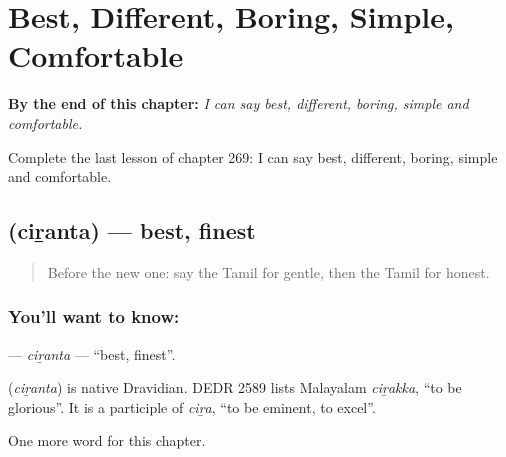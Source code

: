 
\chapter{Best, Different, Boring, Simple, Comfortable}
\label{ch:ta-best-different-boring-simple-comfortable}

\begin{chapteropening}
\textbf{By the end of this chapter:} \emph{I can say best, different, boring, simple and comfortable.}

Complete the last lesson of chapter 269: I can say best, different, boring, simple and comfortable.
\end{chapteropening}

\section[\texorpdfstring{\ta{சிறந்த} (ciṟanta)}{சிறந்த (ciṟanta)}]{ (ciṟanta) — best, finest}

\label{lesson:TA-C269-ciranta}



\begin{quote}
Before the new one: say the Tamil for gentle, then the Tamil for honest.
\end{quote}

\subsection*{You'll want to know: }
\textbf{} — \emph{ciṟanta} — \textquotedblleft{}best, finest\textquotedblright{}.

\begin{cousinweb}
\textbf{} (\emph{ciṟanta}) is native Dravidian. DEDR 2589 lists Malayalam \emph{ciṟakka}, \textquotedblleft{}to be glorious\textquotedblright{}. It is a participle of \emph{ciṟa}, \textquotedblleft{}to be eminent, to excel\textquotedblright{}.
\end{cousinweb}

\begin{grammarlens}[title={What you've built}]
One more word for this chapter.
\end{grammarlens}

